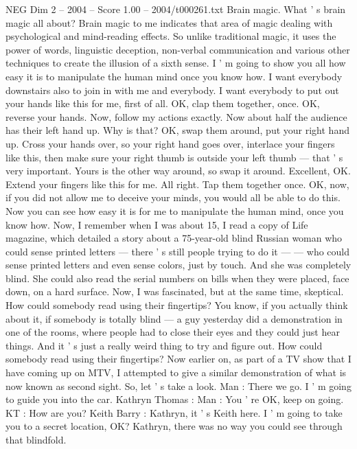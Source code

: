 \begin{textsample}{NEG Dim 2 – 2004 – Score 1.00 – 2004/t000261.txt}  \label{ex:f2_neg_072}
Brain magic.
What ' s brain magic all about?
Brain magic to me indicates that area of magic dealing with psychological and mind-reading effects.
So unlike traditional magic, it uses the power of words, linguistic deception, non-verbal communication and various other techniques to create the illusion of a sixth sense.
I ' m going to show you all how easy it is to manipulate the human mind once you know how.
I want everybody downstairs also to join in with me and everybody.
I want everybody to put out your hands like this for me, first of all.
OK, clap them together, once.
OK, reverse your hands.
Now, follow my actions exactly.
Now about half the audience has their left hand up.
Why is that?
OK, swap them around, put your right hand up.
Cross your hands over, so your right hand goes over, interlace your fingers like this, then make sure your right thumb is outside your left thumb — that ' s very important.
Yours is the other way around, so swap it around.
Excellent, OK.
Extend your fingers like this for me.
All right.
Tap them together once.
OK, now, if you did not allow me to deceive your minds, you would all be able to do this.
Now you can see how easy it is for me to manipulate the human mind, once you know how.
Now, I remember when I was about 15, I read a copy of Life magazine, which detailed a story about a 75-year-old blind Russian woman who could sense printed letters — there ' s still people trying to do it — — who could sense printed letters and even sense colors, just by touch.
And she was completely blind.
She could also read the serial numbers on bills when they were placed, face down, on a hard surface.
Now, I was fascinated, but at the same time, skeptical.
How could somebody read using their fingertips?
You know, if you actually think about it, if somebody is totally blind — a guy yesterday did a demonstration in one of the rooms, where people had to close their eyes and they could just hear things.
And it ' s just a really weird thing to try and figure out.
How could somebody read using their fingertips?
Now earlier on, as part of a TV show that I have coming up on MTV, I attempted to give a similar demonstration of what is now known as second sight.
So, let ' s take a look.
Man : There we go.
I ' m going to guide you into the car.
Kathryn Thomas : Man : You ' re OK, keep on going.
KT : How are you?
Keith Barry : Kathryn, it ' s Keith here.
I ' m going to take you to a secret location, OK?
Kathryn, there was no way you could see through that blindfold.

\end{textsample}
